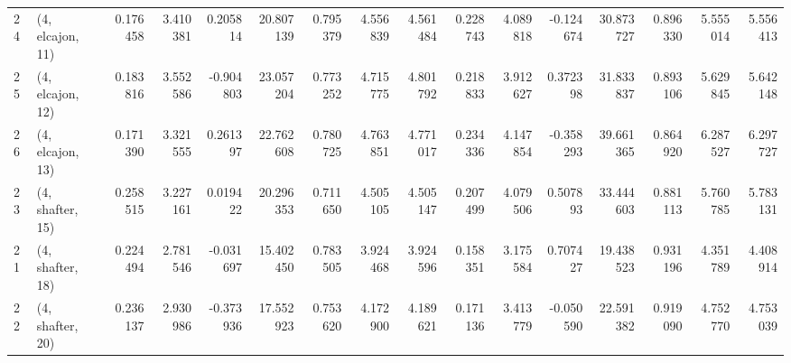 \begin{tabular}{llrrrrrrrrrrrrrr}
24 &  (4, elcajon, 11) &   0.176458 &  3.410381 &  0.205814 &  20.807139 &  0.795379 &   4.556839 &  4.561484 &  0.228743 &   4.089818 & -0.124674 &   30.873727 &  0.896330 &   5.555014 &   5.556413 \\
25 &  (4, elcajon, 12) &   0.183816 &  3.552586 & -0.904803 &  23.057204 &  0.773252 &   4.715775 &  4.801792 &  0.218833 &   3.912627 &  0.372398 &   31.833837 &  0.893106 &   5.629845 &   5.642148 \\
26 &  (4, elcajon, 13) &   0.171390 &  3.321555 &  0.261397 &  22.762608 &  0.780725 &   4.763851 &  4.771017 &  0.234336 &   4.147854 & -0.358293 &   39.661365 &  0.864920 &   6.287527 &   6.297727 \\
23 &  (4, shafter, 15) &   0.258515 &  3.227161 &  0.019422 &  20.296353 &  0.711650 &   4.505105 &  4.505147 &  0.207499 &   4.079506 &  0.507893 &   33.444603 &  0.881113 &   5.760785 &   5.783131 \\
21 &  (4, shafter, 18) &   0.224494 &  2.781546 & -0.031697 &  15.402450 &  0.783505 &   3.924468 &  3.924596 &  0.158351 &   3.175584 &  0.707427 &   19.438523 &  0.931196 &   4.351789 &   4.408914 \\
22 &  (4, shafter, 20) &   0.236137 &  2.930986 & -0.373936 &  17.552923 &  0.753620 &   4.172900 &  4.189621 &  0.171136 &   3.413779 & -0.050590 &   22.591382 &  0.919090 &   4.752770 &   4.753039 \\
\bottomrule
\end{tabular}
